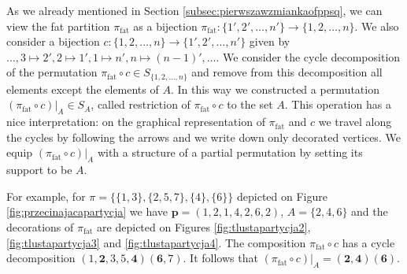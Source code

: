 \documentclass[12pt,dvips]{amsart}
\numberwithin{equation}{section} \numberwithin{figure}{section}
\theoremstyle{plain}
\theoremstyle{definition}
\theoremstyle{remark}
\newcommand{\ppp}{{\mathbf{p}}}
\newcommand{\Sn}[1]{{{S}}_{#1}}
\DeclareMathOperator{\fat}{fat}
\begin{document}
As we already mentioned in Section
\ref{subsec:pierwszawzmiankaofppsq}, we can view the fat partition
$\pi_{\fat}$ as a bijection
$\pi_{\fat}:\{1',2',\dots,n'\}\rightarrow\{1,2,\dots,n\}$. We also
consider a bijection
$c:\{1,2,\dots,n\}\rightarrow\{1',2',\dots,n'\}$ given by
$\dots,3\mapsto 2', 2\mapsto 1', 1\mapsto n', n\mapsto
(n-1)',\dots$. We consider the cycle decomposition of the
permutation $\pi_{\fat}\circ c\in\Sn{\{1,2,\dots,n\}}$ and remove
from this decomposition all elements except the elements of $A$. In
this way we constructed a permutation $(\pi_{\fat}\circ
c)|_A\in\Sn{A}$, called restriction of $\pi_{\fat}\circ c$ to the
set $A$. This operation has a nice interpretation: on the graphical
representation of $\pi_{\fat}$ and $c$ we travel along the cycles by
following the arrows and we write down only decorated vertices. We
equip $(\pi_{\fat}\circ c)|_A$ with a structure of a partial
permutation by setting its support to be $A$.

For example, for $\pi=\big\{ \{1,3\},\{2,5,7\}, \{4\}, \{6\} \big\}$
depicted on Figure \ref{fig:przecinajacapartycja} we have
$\ppp=(1,2,1,4,2,6,2)$, $A=\{2,4,6\}$ and the decorations of
$\pi_{\fat}$ are depicted on Figures \ref{fig:tlustapartycja2},
\ref{fig:tlustapartycja3} and \ref{fig:tlustapartycja4}. The
composition $\pi_{\fat}\circ c$ has a cycle decomposition
$(1,\mathbf{2},3,5,\mathbf{4})(\mathbf{6},7)$.
It follows that $(\pi_{\fat}\circ
c)|_A=(\mathbf{2},\mathbf{4})(\mathbf{6})$.
\end{document}

